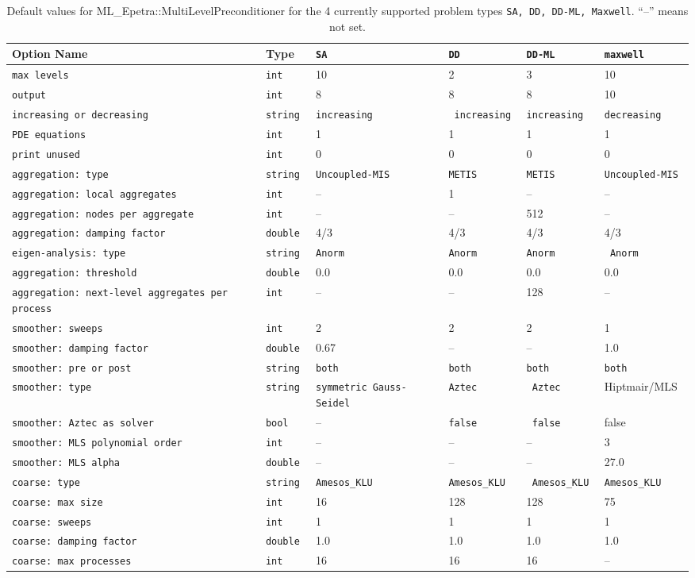\documentclass{article}[11pt]
\begin{document}
\begin{table}
  \begin{tabular}{| p{7cm} | p{2.5cm} | p{2.5cm} | p{2.5cm} | p{2.5cm} |
    p{2.5cm} | }
    \hline
    Option Name & Type & {\tt SA} & {\tt DD} & {\tt DD-ML} & \tt maxwell
    \\
    \hline
    \hline
{\tt max levels} & \tt int & 10 & 2 & 3 & 10 \\
\tt output & \tt int & 8 &  8 & 8 & 10 \\
\tt increasing or decreasing & \tt string & \tt increasing & \tt
increasing & \tt increasing & \tt decreasing \\
\tt PDE equations & \tt int & 1 & 1 & 1 & 1 \\
\tt print unused & \tt int & 0 & 0 & 0 & 0 \\
\hline
\hline
\tt aggregation: type & \tt string & \tt Uncoupled-MIS & \tt METIS & \tt METIS &
\tt Uncoupled-MIS \\
\tt aggregation: local aggregates & \tt int & -- & 1 & -- & -- \\
\tt aggregation: nodes per aggregate & \tt int & -- & -- & 512 & -- \\
\tt aggregation: damping factor & \tt double &  4/3 & 4/3 & 4/3 & 4/3\\
\tt eigen-analysis: type & \tt string & \tt Anorm & \tt Anorm & \tt Anorm & \tt
Anorm \\
\tt aggregation: threshold & \tt double & 0.0 & 0.0 & 0.0 & 0.0\\
\tt aggregation: next-level aggregates per process & \tt int & -- & --
&128 & --\\
\hline
\hline
\tt smoother: sweeps & \tt int & 2 & 2 & 2 & 1 \\
\tt smoother: damping factor & \tt double & 0.67  & -- & --  & 1.0 \\
\tt smoother: pre or post & \tt string & \tt both & \tt both & \tt both
& \tt both \\
\tt smoother: type & \tt string & \tt symmetric Gauss-Seidel & \tt Aztec & \tt
Aztec & Hiptmair/MLS \\
\tt smoother: Aztec as solver & \tt bool & -- & \tt false & \tt
false & false \\
\tt smoother: MLS polynomial order & \tt int & -- & -- & -- & 3 \\
\tt smoother: MLS alpha & \tt double & -- & -- & -- & 27.0 \\
\hline
\hline
\tt coarse: type & \tt string & \tt Amesos\_KLU & \tt Amesos\_KLU  & \tt
Amesos\_KLU & \tt Amesos\_KLU \\
\tt coarse: max size & \tt int & 16 & 128 & 128 & 75 \\
\tt coarse: sweeps & \tt int & 1 & 1 & 1 & 1 \\
\tt coarse: damping factor & \tt double & 1.0 & 1.0 & 1.0 & 1.0 \\
\tt coarse: max processes & \tt int & 16 & 16 & 16 & -- \\
\hline
  \end{tabular}
  \caption{Default values for ML\_Epetra::MultiLevelPreconditioner for
    the 4 currently supported problem types {\tt SA, DD, DD-ML,
    Maxwell}. ``--'' means not set.}
  \label{tab:default}
\end{table}
\end{document}
